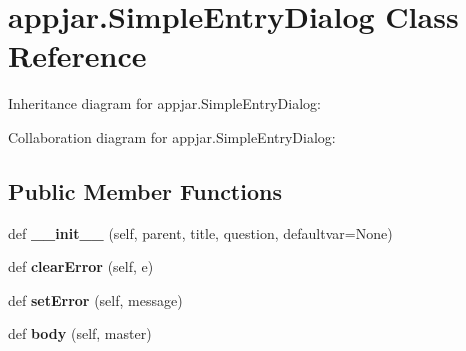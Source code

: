 \hypertarget{classappjar_1_1_simple_entry_dialog}{}\section{appjar.\+Simple\+Entry\+Dialog Class Reference}
\label{classappjar_1_1_simple_entry_dialog}


Inheritance diagram for appjar.\+Simple\+Entry\+Dialog\+:


Collaboration diagram for appjar.\+Simple\+Entry\+Dialog\+:
\subsection*{Public Member Functions}
\begin{DoxyCompactItemize}
\item 
\mbox{\label{classappjar_1_1_simple_entry_dialog_a10c9a9e14af51387dc23e85efd51a2dc}} 
def {\bfseries \+\_\+\+\_\+init\+\_\+\+\_\+} (self, parent, title, question, defaultvar=None)
\item 
\mbox{\label{classappjar_1_1_simple_entry_dialog_af855dd6497909188471d397bc97430b6}} 
def {\bfseries clear\+Error} (self, e)
\item 
\mbox{\label{classappjar_1_1_simple_entry_dialog_ab27c909dccc5db8430a336698aa2c09f}} 
def {\bfseries set\+Error} (self, message)
\item 
\mbox{\label{classappjar_1_1_simple_entry_dialog_a242ecafc7820758828c5ffb4b66bcb74}} 
def {\bfseries body} (self, master)
\end{DoxyCompactItemize}
